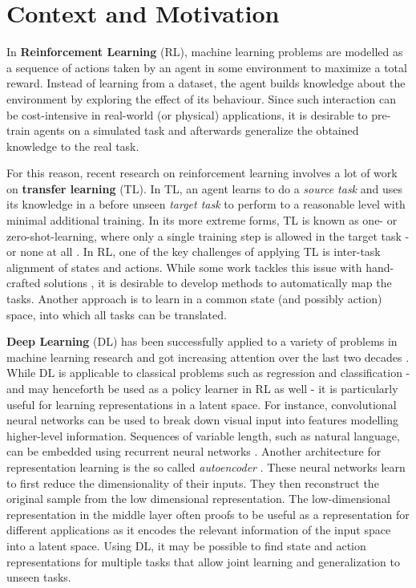\section{Context and Motivation}
\label{sec:context}

In \textbf{Reinforcement Learning} (RL), machine learning problems are modelled as a sequence of actions taken by an agent in some environment to maximize a total reward. Instead of learning from a dataset, the agent builds knowledge about the environment by exploring the effect of its behaviour. Since such interaction can be cost-intensive in real-world (or physical) applications, it is desirable to pre-train agents on a simulated task and afterwards generalize the obtained knowledge to the real task. 

For this reason, recent research on reinforcement learning involves a lot of work on \textbf{transfer learning} (TL). In TL, an agent learns to do a \textit{source task} and uses its knowledge in a before unseen \textit{target task} to perform to a reasonable level with minimal additional training. In its more extreme forms, TL is known as one- or zero-shot-learning, where only a single training step is allowed in the target task - or none at all \citep{goodfellow2016deep}. In RL, one of the key challenges of applying TL is inter-task alignment of states and actions. While some work tackles this issue with hand-crafted solutions \citep[e.g.][]{taylor2007cross}, it is desirable to develop methods to automatically map the tasks. Another approach is to learn in a common state (and possibly action) space, into which all tasks can be translated.

\textbf{Deep Learning} (DL) has been successfully applied to a variety of problems in machine learning research and got increasing attention over the last two decades \citep{goodfellow2016deep}. While DL is applicable to classical problems such as regression and classification - and may henceforth be used as a policy learner in RL as well - it is particularly useful for learning representations in a latent space. For instance, convolutional neural networks can be used to break down visual input into features modelling higher-level information. Sequences of variable length, such as natural language, can be embedded using recurrent neural networks \citep{goldberg2017neural}. Another architecture for representation learning is the so called \textit{autoencoder} \citep{hinton2006reducing}. These neural networks learn to first reduce the dimensionality of their inputs. They then reconstruct the original sample from the low dimensional representation. The low-dimensional representation in the middle layer often proofs to be useful as a representation for different applications as it encodes the relevant information of the input space into a latent space. Using DL, it may be possible to find state and action representations for multiple tasks that allow joint learning and generalization to unseen tasks.

